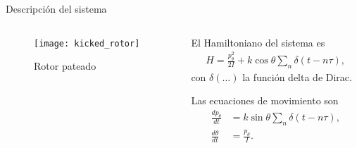 \documentclass[aspectratio=169,xcolor=dvipsnames,7pt]{beamer}
\begin{document}
\begin{frame}{Descripción del sistema}

\begin{columns}
\begin{column}{0.5\textwidth}  %
		\vspace*{-.4cm}
    \begin{figure}
     \texttt{[image: kicked\_rotor]}
     \vspace*{-5mm}
     \caption{\normalsize Rotor pateado}
     \end{figure}
\end{column}

\begin{column}{0.5\textwidth}
El Hamiltoniano del sistema es
\begin{align*}
H = \frac{p^2_{\theta}}{2I} + k\cos\theta\sum_n\delta(t- n \tau),
\end{align*}
con $\delta(\ldots)$ la función delta de Dirac. \vskip 10pt

Las ecuaciones de movimiento son 
\begin{align*}
\frac{dp_{\theta}}{dt} &= k\sin\theta\sum_n\delta(t - n\tau), \\
\frac{d\theta}{dt} &= \frac{p_{\theta}}{I}.
\end{align*}

\end{column}
\end{columns}

\end{frame}
\end{document}
